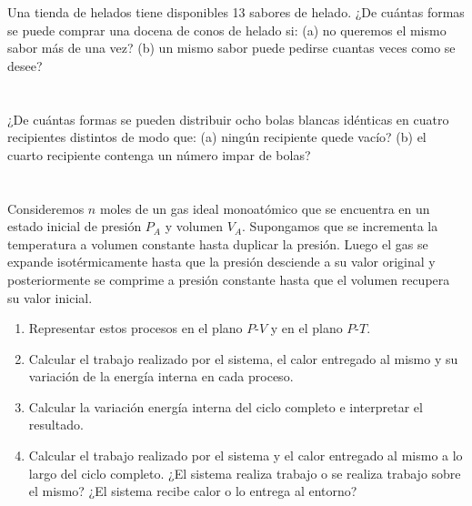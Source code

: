\documentclass[a4paper,11pt]{article}
\begin{document}
Una tienda de helados tiene disponibles 13 sabores de helado. ¿De cuántas formas se
puede comprar una docena de conos de helado si:
(a) no queremos el mismo sabor más de una vez?
(b) un mismo sabor puede pedirse cuantas veces como se desee?


\section{}

¿De cuántas formas se pueden distribuir ocho bolas blancas idénticas en cuatro
recipientes distintos de modo que:
(a) ningún recipiente quede vacío?
(b) el cuarto recipiente contenga un número impar de bolas?


\section{}

Consideremos $n$ moles de un gas ideal monoatómico que se encuentra en
un estado inicial de presión $P_A$ y volumen $V_A$. Supongamos que se
incrementa la temperatura a volumen constante hasta duplicar la
presión. Luego el gas se expande isotérmicamente hasta que la presión
desciende a su valor original y posteriormente se comprime a presión
constante hasta que el volumen recupera su valor inicial.

\begin{enumerate}[label=(\alph*),
                  leftmargin=2\parindent,
                  rightmargin=2\parindent]

    \item{Representar estos procesos en el plano $P$-$V$ y en el plano
          $P$-$T$.}

    \item{Calcular el trabajo realizado por el sistema, el calor
          entregado al mismo y su variación de la energía interna en
          cada proceso.}

    \item{Calcular la variación energía interna del ciclo completo e
          interpretar el resultado.}

    \item{Calcular el trabajo realizado por el sistema y el calor
          entregado al mismo a lo largo del ciclo completo. ¿El sistema
          realiza trabajo o se realiza trabajo sobre el mismo? ¿El
          sistema recibe calor o lo entrega al entorno?}

\end{enumerate}
\end{document}
